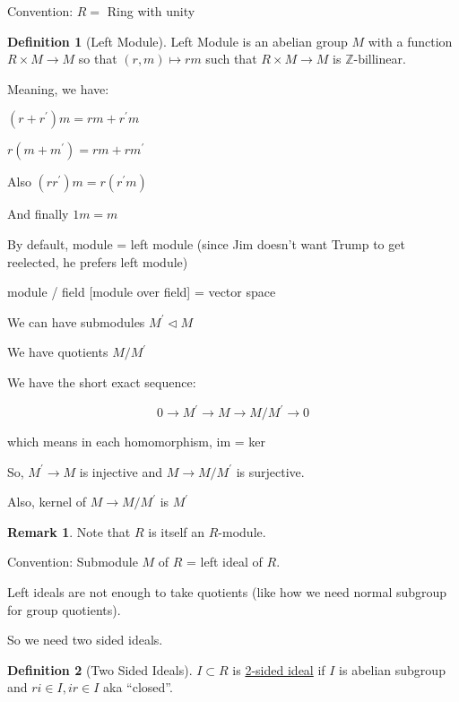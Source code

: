 \documentclass{article}
\theoremstyle{definition}
\newtheorem*{definition}{Definition}
\newtheorem*{remark}{Remark}
\begin{document}
Convention: \(R = \) Ring with unity

\begin{definition}
    [Left Module]

    Left Module is an abelian group \(M\) with a function \(R \times M \to M\) so that \((r,m) \mapsto rm\) such that \(R \times M \to M\) is \(\mathbb{Z}\)-billinear.

    Meaning, we have:

    \((r+r^{\prime} )m = rm + r^{\prime} m\) 

    \(r(m + m^{\prime} ) = r m + r m^{\prime} \) 

    Also \((r r^{\prime} )m = r(r^{\prime} m)\) 

    And finally \(1m = m\) 
\end{definition}

By default, module = left module (since Jim doesn't want Trump to get reelected, he prefers left module)

module / field [module over field] = vector space

We can have submodules \(M^{\prime} \triangleleft M\)

We have quotients \(M / M^{\prime} \) 

We have the short exact sequence:

\[
    0 \to M^{\prime} \to M \to M / M^{\prime} \to 0
\]

which means in each homomorphism, im = ker

So, \(M^{\prime} \to M\) is injective and \(M \to M / M^{\prime} \) is surjective.

Also, kernel of \(M \to M / M^{\prime} \) is \(M^{\prime} \)


\begin{remark}
    Note that \(R\) is itself an \(R\)-module. 

    Convention: Submodule \(M\) of \(R\) = left ideal of \(R\). 

    Left ideals are not enough to take quotients (like how we need normal subgroup for group quotients).
\end{remark}

So we need two sided ideals.

\begin{definition}
    [Two Sided Ideals]

    \(I \subset R\) is \underline{2-sided ideal} if \(I\) is abelian subgroup and \(ri \in I, ir \in I\) aka ``closed''.
\end{definition}
\end{document}
